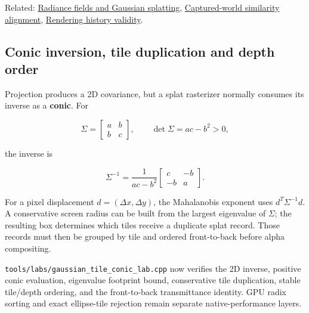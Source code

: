 Related: \hyperref[appendix-c5b332e400e7]{Radiance fields and Gaussian splatting}, \hyperref[appendix-5f40b4fea463]{Captured-world similarity alignment}, \hyperref[appendix-2e7e9fd28a2c]{Rendering history validity}.

\subsection{Conic inversion, tile duplication and depth order}\label{appendix-24269cb6977c-conic-inversion-tile-duplication-and-depth-order}

Projection produces a 2D covariance, but a splat rasterizer normally consumes its inverse as a \textbf{conic}. For

\[
\Sigma=
\begin{bmatrix}
a&b\\
b&c
\end{bmatrix},
\qquad
\det\Sigma=ac-b^2>0,
\]

the inverse is

\[
\Sigma^{-1}
=
\frac{1}{ac-b^2}
\begin{bmatrix}
c&-b\\
-b&a
\end{bmatrix}.
\]

For a pixel displacement \(d=(\Delta x,\Delta y)\), the Mahalanobis exponent uses \(d^T\Sigma^{-1}d\). A conservative screen radius can be built from the largest eigenvalue of \(\Sigma\); the resulting box determines which tiles receive a duplicate splat record. Those records must then be grouped by tile and ordered front-to-back before alpha compositing.

\texttt{tools/labs/gaussian\_tile\_conic\_lab.cpp} now verifies the 2D inverse, positive conic evaluation, eigenvalue footprint bound, conservative tile duplication, stable tile/depth ordering, and the front-to-back transmittance identity. GPU radix sorting and exact ellipse-tile rejection remain separate native-performance layers.
